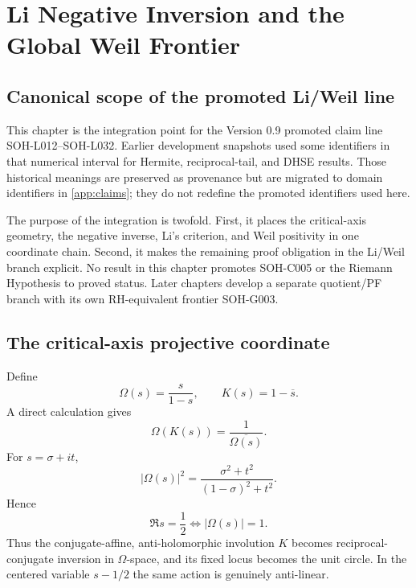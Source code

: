 \chapter{Li Negative Inversion and the Global Weil Frontier}
\label{chap:li-negative-inverse}

\section{Canonical scope of the promoted Li/Weil line}

This chapter is the integration point for the Version 0.9 promoted claim line SOH-L012--SOH-L032. Earlier development snapshots used some identifiers in that numerical interval for Hermite, reciprocal-tail, and DHSE results. Those historical meanings are preserved as provenance but are migrated to domain identifiers in \cref{app:claims}; they do not redefine the promoted identifiers used here.

The purpose of the integration is twofold. First, it places the critical-axis geometry, the negative inverse, Li's criterion, and Weil positivity in one coordinate chain. Second, it makes the remaining proof obligation in the Li/Weil branch explicit. No result in this chapter promotes SOH-C005 or the Riemann Hypothesis to proved status. Later chapters develop a separate quotient/PF branch with its own RH-equivalent frontier SOH-G003.

\section{The critical-axis projective coordinate}

Define
\begin{equation}
 \Omega(s)=\frac{s}{1-s},
 \qquad
 K(s)=1-\overline{s}.
 \label{eq:v2-omega-K}
\end{equation}
A direct calculation gives
\begin{equation}
 \Omega(K(s))=\frac{1}{\overline{\Omega(s)}}.
 \label{eq:v2-omega-K-conjugacy}
\end{equation}
For $s=\sigma+it$,
\begin{equation}
 |\Omega(s)|^2
 =\frac{\sigma^2+t^2}{(1-\sigma)^2+t^2}.
 \label{eq:v2-omega-modulus}
\end{equation}
Hence
\begin{equation}
 \boxed{\Re s=\frac12\iff |\Omega(s)|=1.}
 \label{eq:v2-critical-unit-circle}
\end{equation}
Thus the conjugate-affine, anti-holomorphic involution $K$ becomes reciprocal-conjugate inversion in $\Omega$-space, and its fixed locus becomes the unit circle. In the centered variable $s-1/2$ the same action is genuinely anti-linear.

